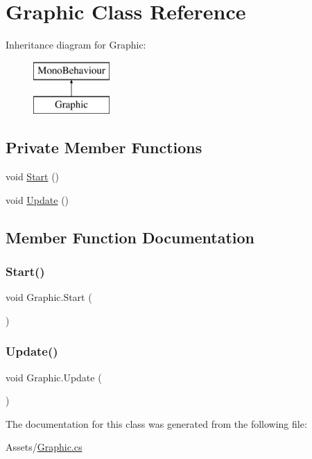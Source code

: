 \hypertarget{class_graphic}{}\section{Graphic Class Reference}
\label{class_graphic}
Inheritance diagram for Graphic\+:\begin{figure}[H]
\begin{center}
\leavevmode
\includegraphics[height=2.000000cm]{class_graphic}
\end{center}
\end{figure}
\subsection*{Private Member Functions}
\begin{DoxyCompactItemize}
\item 
void \hyperlink{class_graphic_a382da4af4932b2aaffec2d5083527fbd}{Start} ()
\item 
void \hyperlink{class_graphic_a6d4e14e5b088fdffe79fe221ca2f2a10}{Update} ()
\end{DoxyCompactItemize}


\subsection{Member Function Documentation}
\mbox{\label{class_graphic_a382da4af4932b2aaffec2d5083527fbd}} 
\subsubsection{\texorpdfstring{Start()}{Start()}}
{\footnotesize\ttfamily void Graphic.\+Start (\begin{DoxyParamCaption}{ }\end{DoxyParamCaption})\hspace{0.3cm}{\ttfamily [private]}}

\mbox{\label{class_graphic_a6d4e14e5b088fdffe79fe221ca2f2a10}} 
\subsubsection{\texorpdfstring{Update()}{Update()}}
{\footnotesize\ttfamily void Graphic.\+Update (\begin{DoxyParamCaption}{ }\end{DoxyParamCaption})\hspace{0.3cm}{\ttfamily [private]}}



The documentation for this class was generated from the following file\+:\begin{DoxyCompactItemize}
\item 
Assets/\hyperlink{_graphic_8cs}{Graphic.\+cs}\end{DoxyCompactItemize}
